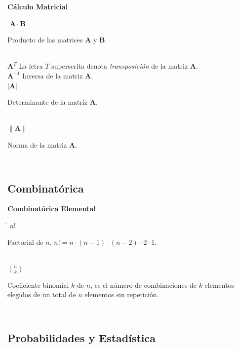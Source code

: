 \documentclass[11pt,letterpaper,twoside]{report}%
\begin{document}
\newpage
{\bf Cálculo Matricial}
\begin{tabbing}
\hspace{\hdiml} \= \hspace{\hdim} \kill
$\mathbf{A}\cdot \mathbf{B}$ \> \parbox[t]{\hdim}{Producto de las matrices $\mathbf{A}$ y $\mathbf{B}$.}\\[\lsk]
$\mathbf{A}^T$         \> La letra $T$ superscrita denota {\em transposición} de la matriz $\mathbf{A}$.\\[\lsk]
$\mathbf{A}^{-1}$         \> Inversa de la matriz $\mathbf{A}$.\\[\lsk]
$|\mathbf{A}|$ \> \parbox[t]{\hdim}{Determinante de la matriz $\mathbf{A}$.}\\[\lsk]
$\|\mathbf{A}\|$ \> \parbox[t]{\hdim}{Norma de la matriz $\mathbf{A}$.}\\[\lsk]

\end{tabbing}


\subsection{Combinatórica}

{\bf Combinatórica Elemental}
\begin{tabbing}
\hspace{\hdiml} \= \hspace{\hdim} \kill
$n!$ \> \parbox[t]{\hdim}{Factorial de $n$, $n!=n\cdot (n-1)\cdot (n-2)\cdots 2\cdot 1$.}\\[\lsk]
$\binom{n}{k}$ \> \parbox[t]{\hdim}{Coeficiente binomial $k$ de $n$, es el número de combinaciones de $k$ elementos elegidos de un total de $n$ elementos sin  repetición.}\\[\lsk]
\end{tabbing}


\subsection{Probabilidades y Estadística}
\end{document}
